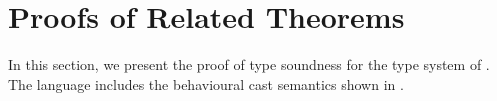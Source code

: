\documentclass[acmlarge, anonymous, authordraft, review]{acmart} %
\begin{document}
% 

\section{Proofs of Related Theorems}

In this section, we present the proof of type soundness for the type system of \kafka. The \kafka language includes the behavioural cast
semantics shown in . \\

% 
\end{document}
